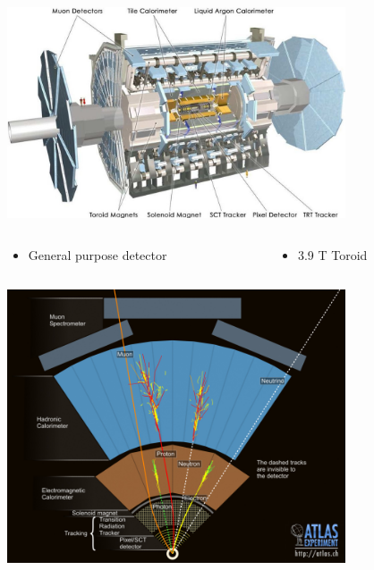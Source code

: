 \documentclass{beamer}
\newcommand*{\header}[1]{\fontsize{16}{8}\selectfont \textbf{{\color{MyPurple}{#1}}}}
\begin{document}
\begin{frame}
\begin{center}
\header{The ATLAS Detector}
\end{center}
\begin{center}
\includegraphics[width=0.75\textwidth]{figures/ATLAS_det}
\end{center}
\begin{columns}
\begin{column}{0.5\textwidth}
\begin{itemize}
\item General purpose detector
\end{itemize}
\end{column}
\begin{column}{0.5\textwidth}
\begin{itemize}
\item 3.9 T Toroid
\end{itemize}
\end{column}
\end{columns}
\end{frame}

\begin{frame}
\begin{center}
\header{Particles in the Detector}
\end{center}
\begin{center}
\includegraphics[width=0.75\textwidth]{figures/layers}
\end{center}
\end{frame}
\end{document}
